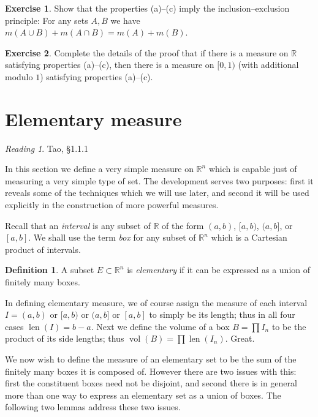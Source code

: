 \documentclass[11pt,oneside]{amsbook}
\newcommand{\RR}{{\mathbb R}}
\DeclareMathOperator{\len}{len}
\DeclareMathOperator{\vol}{vol}
\theoremstyle{definition}
\newtheorem{exerc}{Exercise}[section]
\theoremstyle{plain}
\theoremstyle{definition}
\newtheorem{defn}[thm]{Definition}
\theoremstyle{remark}
\newtheorem*{reading}{Reading}
\numberwithin{equation}{section}
\numberwithin{figure}{section}
\begin{document}
\begin{exerc}
  Show that the properties (a)--(c) imply the inclusion--exclusion principle: For any sets $A,B$ we have $m(A\cup B)+m(A\cap B)=m(A)+m(B)$.
\end{exerc}

\begin{exerc}
  Complete the details of the proof that if there is a measure on $\RR$ satisfying properties (a)--(c), then there is a measure on $[0,1)$ (with additional modulo $1$) satisfying properties (a)--(c).
\end{exerc}

\newpage
\section{Elementary measure}

\begin{reading}
  Tao, \S1.1.1
\end{reading}

In this section we define a very simple measure on $\RR^n$ which is capable just of measuring a very simple type of set. The development serves two purposes: first it reveals some of the techniques which we will use later, and second it will be used explicitly in the construction of more powerful measures.

Recall that an \emph{interval} is any subset of $\RR$ of the form $(a,b)$, $[a,b)$, $(a,b]$, or $[a,b]$. We shall use the term \emph{box} for any subset of $\RR^n$ which is a Cartesian product of intervals.

\begin{defn}
  A subset $E\subset\RR^n$ is \emph{elementary} if it can be expressed as a union of finitely many boxes.
\end{defn}

In defining elementary measure, we of course assign the measure of each interval $I=(a,b)$ or $[a,b)$ or $(a,b]$ or $[a,b]$ to simply be its length; thus in all four cases $\len(I)=b-a$. Next we define the volume of a box $B=\prod I_n$ to be the product of its side lengths; thus $\vol(B)=\prod\len(I_n)$. Great.

We now wish to define the measure of an elementary set to be the sum of the finitely many boxes it is composed of. However there are two issues with this: first the constituent boxes need not be disjoint, and second there is in general more than one way to express an elementary set as a union of boxes. The following two lemmas address these two issues.
\end{document}
